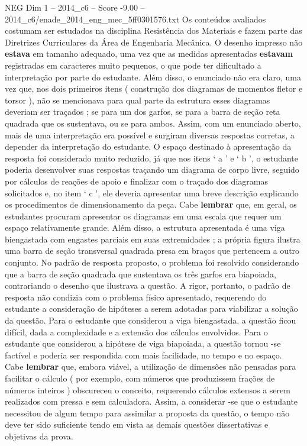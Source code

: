 \begin{textsample}{NEG Dim 1 – 2014\_c6 – Score -9.00 – 2014\_c6/enade\_2014\_eng\_mec\_5ff0301576.txt}
Os conteúdos avaliados costumam ser estudados na disciplina Resistência dos Materiais e fazem parte das Diretrizes Curriculares da Área de Engenharia Mecânica.
O desenho impresso não \textbf{estava} em tamanho adequado, uma vez que as medidas apresentadas \textbf{estavam} registradas em caracteres muito pequenos, o que pode ter dificultado a interpretação por parte do estudante.
Além disso, o enunciado não era claro, uma vez que, nos dois primeiros itens ( construção dos diagramas de momentos fletor e torsor ), não se mencionava para qual parte da estrutura esses diagramas deveriam ser traçados ; se para um dos garfos, se para a barra de seção reta quadrada que os sustentava, ou se para ambos.
Assim, com um enunciado aberto, mais de uma interpretação era possível e surgiram diversas respostas corretas, a depender da interpretação do estudante.
O espaço destinado à apresentação da resposta foi considerado muito reduzido, já que nos itens ‘ a ’ e ‘ b ’, o estudante poderia desenvolver suas respostas traçando um diagrama de corpo livre, seguido por cálculos de reações de apoio e finalizar com o traçado dos diagramas solicitados e, no item ‘ c ’, ele deveria apresentar uma breve descrição explicando os procedimentos de dimensionamento da peça.
Cabe \textbf{lembrar} que, em geral, os estudantes procuram apresentar os diagramas em uma escala que requer um espaço relativamente grande.
Além disso, a estrutura apresentada é uma viga biengastada com engastes parciais em suas extremidades ; a própria figura ilustra uma barra de seção transversal quadrada presa em braços que pertencem a outro conjunto.
No padrão de resposta proposto, o problema foi resolvido considerando que a barra de seção quadrada que sustentava os três garfos era biapoiada, contrariando o desenho que ilustrava a questão.
A rigor, portanto, o padrão de resposta não condizia com o problema físico apresentado, requerendo do estudante a consideração de hipóteses a serem adotadas para viabilizar a solução da questão.
Para o estudante que considerou a viga biengastada, a questão ficou difícil, dada a complexidade e a extensão dos cálculos envolvidos.
Para o estudante que considerou a hipótese de viga biapoiada, a questão tornou -se factível e poderia ser respondida com mais facilidade, no tempo e no espaço.
Cabe \textbf{lembrar} que, embora viável, a utilização de dimensões não pensadas para facilitar o cálculo ( por exemplo, com números que produzissem frações de números inteiros ) obscureceu o conceito, requerendo cálculos extensos a serem realizados com pressa e sem calculadora.
Assim, a considerar -se que o estudante necessitou de algum tempo para assimilar a proposta da questão, o tempo não deve ter sido suficiente tendo em vista as demais questões dissertativas e objetivas da prova.

\end{textsample}

